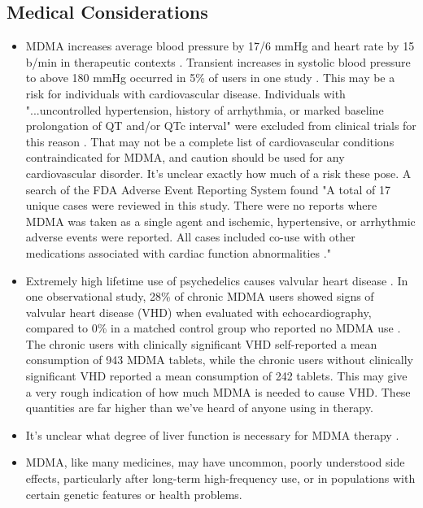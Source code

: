 \documentclass[12pt,letterpaper]{book}
\begin{document}
\subsection*{Medical Considerations}
\begin{itemize}
    \item MDMA increases average blood pressure by 17/6 mmHg and heart rate by 15 b/min in therapeutic contexts \cite{mitchellMDMAClinicalTrial}. Transient increases in systolic blood pressure to above 180 mmHg occurred in 5\% of users in one study \cite{vizeliActuteEffects}. This may be a risk for individuals with cardiovascular disease. Individuals with "...uncontrolled hypertension, history of arrhythmia, or marked baseline prolongation of QT and/or QTc interval" were excluded from clinical trials for this reason \cite{mitchellMDMAClinicalTrial2}. That may not be a complete list of cardiovascular conditions contraindicated for MDMA, and caution should be used for any cardiovascular disorder. It's unclear exactly how much of a risk these pose. A search of the FDA Adverse Event Reporting System found "A total of 17 unique cases were reviewed in this study. There were no reports where MDMA was taken as a single agent and ischemic, hypertensive, or arrhythmic adverse events were reported. All cases included co-use with other medications associated with cardiac function abnormalities \cite{makunts2023concomitant}."
    \item Extremely high lifetime use of psychedelics causes valvular heart disease \cite{droogmans2007valvular,tagen2023valvular}. In one observational study, 28\% of chronic MDMA users showed signs of valvular heart disease (VHD) when evaluated with echocardiography, compared to 0\% in a matched control group who reported no MDMA use \cite{droogmans2007valvular}. The chronic users with clinically significant VHD self-reported a mean consumption of 943 MDMA tablets, while the chronic users without clinically significant VHD reported a mean consumption of 242 tablets. This may give a very rough indication of how much MDMA is needed to cause VHD. These quantities are far higher than we've heard of anyone using in therapy.
    \item It's unclear what degree of liver function is necessary for MDMA therapy \cite{krausCirrhosis}.
    \item MDMA, like many medicines, may have uncommon, poorly understood side effects, particularly after long-term high-frequency use, or in populations with certain genetic features or health problems.

\end{itemize}
\end{document}
